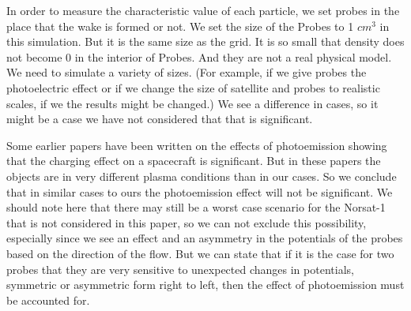 
In order to measure the characteristic value of each particle, we set probes in the
place that the wake is formed or not. 
We set the size of the Probes to 1 $cm^3$ in this simulation. But it is the same size as the grid.
It is so small that density does not become 0 in the interior of Probes. And they are not a real 
physical model. We need to simulate a variety of sizes.
(For example, if we give probes the photoelectric effect or if we change the size of satellite and 
probes to realistic scales, if we the results might be changed.)
We see a difference in cases, so it might be a case we have not considered that that is significant.

Some earlier papers have been written on the effects of photoemission showing that the charging effect 
on a spacecraft is significant.\citep{ergun_spacecraft_2010} But in these papers the objects are in very different
plasma conditions than in our cases. So we conclude that in similar cases to ours the photoemission effect
will not be significant. We should note here that there may still be a worst case scenario for the Norsat-1
that is not considered in this paper, so we can not exclude this possibility, especially since we see an effect and an
asymmetry in the potentials of the probes based on the direction of the flow. But we can state that if 
it is the case for two probes that they are very sensitive to unexpected changes in potentials, symmetric or asymmetric form 
right to left, then the effect of photoemission must be accounted for.